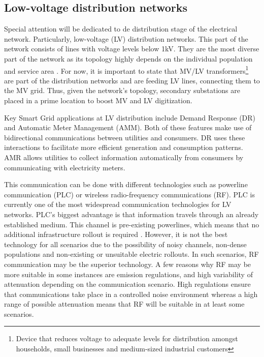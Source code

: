 \subsection{Low-voltage distribution networks}\label{section_introduction_subsection_lv_networks}
Special attention will be dedicated to de distribution stage of the electrical network. Particularly, low-voltage (LV) distribution networks. This part of the network consists of lines with voltage levels below 1kV. They are the most diverse part of the network as its topology highly depends on the individual population and service area \cite{telco_ntwks_for_the_smart_grid}. For now, it is important to state that MV/LV transformers\footnote{Device that reduces voltage to adequate levels for distribution amongst households, small businesses and medium-sized industrial customers} are part of the distribution networks and are feeding LV lines, connecting them to the MV grid. Thus, given the network's topology, secondary substations are placed in a prime location to boost MV and LV digitization. 

Key Smart Grid applications at LV distribution include Demand Response (DR) and Automatic Meter Management (AMM). Both of these features make use of bidirectional communications between utilities and consumers. DR uses these interactions to facilitate more efficient generation and consumption patterns. AMR allows utilities to collect information automatically from consumers by communicating with electricity meters.

This communication can be done with different technologies such as powerline communication (PLC) or wireless radio-frequency communications (RF). PLC is currently one of the most widespread communication technologies for LV networks. PLC's biggest advantage is that information travels through an already established medium. This channel is pre-existing powerlines, which means that no additional infrastructure rollout is required \cite{primeWhitePaper}.  However, it is not the best technology for all scenarios due to the possibility of noisy channels, non-dense populations and non-existing or unsuitable electric rollouts. In such scenarios, RF communication may be the superior technology. A few reasons why RF may be more suitable in some instances are emission regulations, and high variability of attenuation depending on the communication scenario. High regulations ensure that communications take place in a controlled noise environment whereas a high range of possible attenuation means that RF will be suitable in at least some scenarios.


